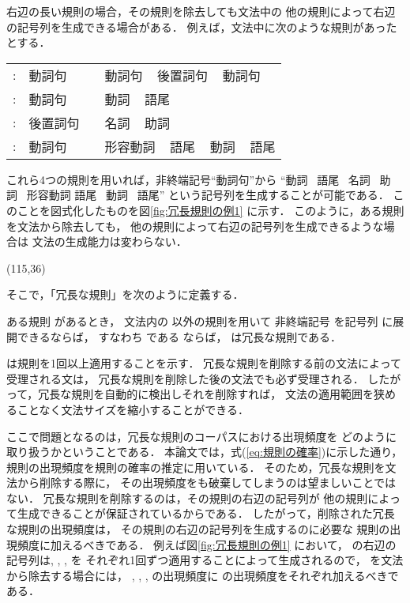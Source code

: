 右辺の長い規則の場合，その規則を除去しても文法中の
他の規則によって右辺の記号列を生成できる場合がある．
例えば，文法中に次のような規則があったとする．
\begin{center}
  \begin{tabular}{llcl}
     :    & 動詞句   &  &
      動詞句 ~ 後置詞句 ~ 動詞句 \\[-1mm]
     : & 動詞句   &  &
      動詞 ~ 語尾 \\[-1mm]
     : & 後置詞句 &  &
      名詞 ~ 助詞  \\[-1mm]
     : & 動詞句   &  &
      形容動詞 ~ 語尾 ~ 動詞 ~ 語尾 \\
  \end{tabular}
\end{center}
これら4つの規則を用いれば，非終端記号``動詞句''から
``動詞~ 語尾~ 名詞~ 助詞~ 形容動詞 語尾~ 動詞~ 語尾''
という記号列を生成することが可能である．
このことを図式化したものを図\ref{fig:冗長規則の例1} に示す．
このように，ある規則を文法から除去しても，
他の規則によって右辺の記号列を生成できるような場合は
文法の生成能力は変わらない．

\begin{center}
  \bigskip
  \atari(115,36)
\end{center}

そこで，「冗長な規則」を次のように定義する．
\begin{center}
  \begin{minipage}{0.73\textwidth}
    ある規則  があるとき，
    文法内の  以外の規則を用いて
    非終端記号  を記号列  に展開できるならば，
    すなわち  である
    ならば， は冗長な規則である．
  \end{minipage}
\end{center}

\noindent
 は規則を1回以上適用することを示す．
冗長な規則を削除する前の文法によって受理される文は，
冗長な規則を削除した後の文法でも必ず受理される．
したがって，冗長な規則を自動的に検出しそれを削除すれば，
文法の適用範囲を狭めることなく文法サイズを縮小することができる．

ここで問題となるのは，冗長な規則のコーパスにおける出現頻度を
どのように取り扱うかということである．
本論文では，式(\ref{eq:規則の確率})に示した通り，
規則の出現頻度を規則の確率の推定に用いている．
そのため，冗長な規則を文法から削除する際に，
その出現頻度をも破棄してしまうのは望ましいことではない．
冗長な規則を削除するのは，その規則の右辺の記号列が
他の規則によって生成できることが保証されているからである．
したがって，削除された冗長な規則の出現頻度は，
その規則の右辺の記号列を生成するのに必要な
規則の出現頻度に加えるべきである．
例えば図\ref{fig:冗長規則の例1} において，
 の右辺の記号列は, , ,  を
それぞれ1回ずつ適用することによって生成されるので，
 を文法から除去する場合には，
, , ,  の出現頻度に
 の出現頻度をそれぞれ加えるべきである．

